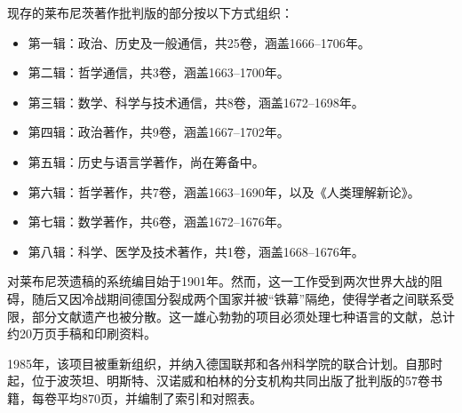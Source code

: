 现存的莱布尼茨著作批判版的部分按以下方式组织：
\begin{itemize}
\item 第一辑：政治、历史及一般通信，共25卷，涵盖1666–1706年。
\item 第二辑：哲学通信，共3卷，涵盖1663–1700年。
\item 第三辑：数学、科学与技术通信，共8卷，涵盖1672–1698年。
\item 第四辑：政治著作，共9卷，涵盖1667–1702年。
\item 第五辑：历史与语言学著作，尚在筹备中。
\item 第六辑：哲学著作，共7卷，涵盖1663–1690年，以及《人类理解新论》。
\item 第七辑：数学著作，共6卷，涵盖1672–1676年。
\item 第八辑：科学、医学及技术著作，共1卷，涵盖1668–1676年。
\end{itemize}
对莱布尼茨遗稿的系统编目始于1901年。然而，这一工作受到两次世界大战的阻碍，随后又因冷战期间德国分裂成两个国家并被“铁幕”隔绝，使得学者之间联系受限，部分文献遗产也被分散。这一雄心勃勃的项目必须处理七种语言的文献，总计约20万页手稿和印刷资料。

1985年，该项目被重新组织，并纳入德国联邦和各州科学院的联合计划。自那时起，位于波茨坦、明斯特、汉诺威和柏林的分支机构共同出版了批判版的57卷书籍，每卷平均870页，并编制了索引和对照表。
